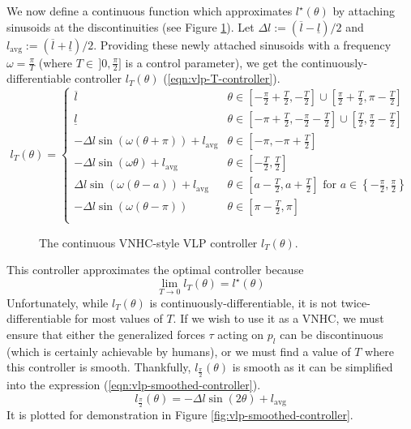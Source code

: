 We now define a continuous function which
approximates \(l^\star(\theta)\) by attaching sinusoids at the
discontinuities (see Figure \ref{fig:vlp-T-controller}). 
Let \(\Delta l := (\overline{l} - \underline{l})/2\) and 
\(l_{\text{avg}} := (\overline{l} + \underline{l})/2\).
Providing these newly attached sinusoids with a frequency \(\omega = \frac{\pi}{T}\) 
(where \(T \in \, ]0,\frac{\pi}{2}]\) is a control parameter), we get the
continuously-differentiable controller \(l_T(\theta)\) (\ref{eqn:vlp-T-controller}).
\begin{equation}\label{eqn:vlp-T-controller}
   l_T(\theta) = \begin{cases}
      \overline{l} & \theta \in \left[-\frac{\pi}{2} + \frac{T}{2}, -\frac{T}{2}\right] 
      \cup \left[\frac{\pi}{2} + \frac{T}{2}, \pi - \frac{T}{2}\right] \\
      \underline{l} & \theta \in \left[-\pi + \frac{T}{2}, -\frac{\pi}{2} - \frac{T}{2}\right] 
      \cup \left[\frac{T}{2}, \frac{\pi}{2} - \frac{T}{2}\right] \\
      -\Delta l \sin(\omega(\theta + \pi)) + l_{\text{avg}} & \theta \in
      \left[-\pi,-\pi + \frac{T}{2}\right] \\
      -\Delta l \sin(\omega \theta) + l_\text{avg} & \theta \in [-\frac{T}{2},
      \frac{T}{2}] \\
      \Delta l \sin(\omega(\theta - a)) + l_\text{avg} & 
      \theta \in \left[a - \frac{T}{2}, a + \frac{T}{2}\right] \text{ for } 
      a \in \left\{-\frac{\pi}{2}, \frac{\pi}{2}\right\} \\
      -\Delta l \sin(\omega(\theta-\pi)) & \theta \in \left[\pi - \frac{T}{2},\pi\right] \\
   \end{cases}
\end{equation}

\begin{figure}
   \centering
   
   \caption{The continuous VNHC-style VLP controller \(l_T(\theta)\).}\label{fig:vlp-T-controller}
\end{figure}

This controller approximates the optimal controller because 
\[
   \lim\limits_{T \rightarrow 0} l_T(\theta) = l^\star(\theta)
\]
Unfortunately, while \(l_T(\theta)\) is continuously-differentiable, 
it is not twice-differentiable for most values of \(T\).
If we wish to use it as a VNHC, we must ensure that either the generalized
forces \(\tau\) acting on \(p_l\) can be discontinuous (which is certainly
achievable by humans), or we must find a value of \(T\) where this controller is
smooth.
Thankfully, \(l_{\frac{\pi}{2}}(\theta)\) is smooth as it can be simplified into
the expression (\ref{eqn:vlp-smoothed-controller}). 
\begin{equation}\label{eqn:vlp-smoothed-controller}
   l_\frac{\pi}{2}(\theta) = -\Delta l \sin(2\theta) + l_{\text{avg}}
\end{equation}
It is plotted for demonstration in Figure \ref{fig:vlp-smoothed-controller}.

